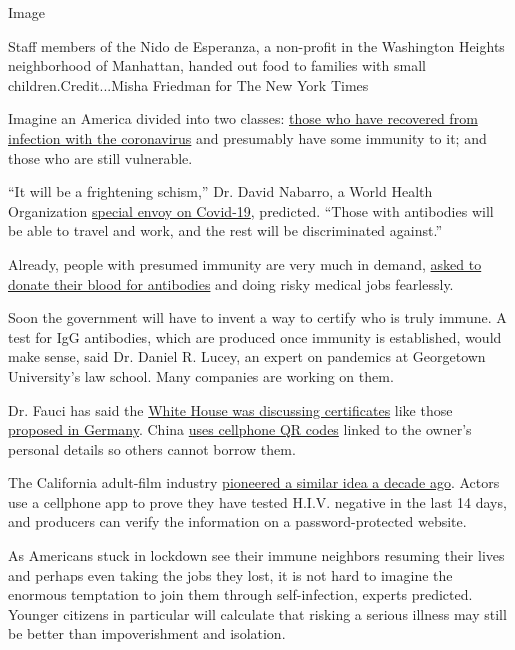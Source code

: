 Image

Staff members of the Nido de Esperanza, a non-profit in the Washington
Heights neighborhood of Manhattan, handed out food to families with
small children.Credit...Misha Friedman for The New York Times

Imagine an America divided into two classes:
\href{https://www.nytimes3xbfgragh.onion/2020/04/11/us/coronavirus-survivors.html}{those
who have recovered from infection with the coronavirus} and presumably
have some immunity to it; and those who are still vulnerable.

``It will be a frightening schism,'' Dr. David Nabarro, a World Health
Organization
\href{https://www.who.int/dg/speeches/detail/who-director-general-s-opening-remarks-at-the-media-briefing-on-covid-19-on-21-february-2020}{special
envoy on Covid-19}, predicted. ``Those with antibodies will be able to
travel and work, and the rest will be discriminated against.''

Already, people with presumed immunity are very much in demand,
\href{https://www.medicinenet.com/script/main/art.asp?articlekey=229963}{asked
to donate their blood for antibodies} and doing risky medical jobs
fearlessly.

Soon the government will have to invent a way to certify who is truly
immune. A test for IgG antibodies, which are produced once immunity is
established, would make sense, said Dr. Daniel R. Lucey, an expert on
pandemics at Georgetown University's law school. Many companies are
working on them.

Dr. Fauci has said the
\href{https://www.politico.com/news/2020/04/10/fauci-coronavirus-immunity-cards-for-americans-are-being-discussed-178784}{White
House was discussing certificates} like those
\href{https://www.newsweek.com/germany-antibodies-tests-general-public-immunity-certificates-1494934}{proposed
in Germany}. China
\href{https://www.nytimes3xbfgragh.onion/2020/03/01/business/china-coronavirus-surveillance.html}{uses
cellphone QR codes} linked to the owner's personal details so others
cannot borrow them.

The California adult-film industry
\href{https://www.nytimes3xbfgragh.onion/2012/11/06/health/unlikely-model-for-hiv-prevention-porn-industry.html}{pioneered
a similar idea a decade ago}. Actors use a cellphone app to prove they
have tested H.I.V. negative in the last 14 days, and producers can
verify the information on a password-protected website.

As Americans stuck in lockdown see their immune neighbors resuming their
lives and perhaps even taking the jobs they lost, it is not hard to
imagine the enormous temptation to join them through self-infection,
experts predicted. Younger citizens in particular will calculate that
risking a serious illness may still be better than impoverishment and
isolation.

